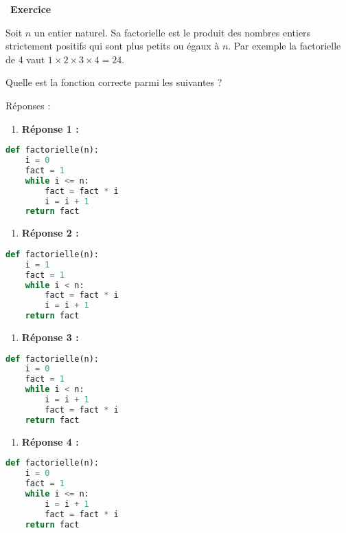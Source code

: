 \documentclass[
  11pt,
]{article}
\providecommand{\tightlist}{%
  \setlength{\itemsep}{0pt}\setlength{\parskip}{0pt}}
\newcounter{exo}
\newenvironment{exercice}[1]
{\par \medskip   \addtocounter{exo}{1} \noindent  
\begin{bclogo}[arrondi =0.1,   noborder = true, logo=\bccrayon, marge=4]{~\textbf{Exercice} \textbf{\theexo} {\itshape #1} }  \par}
{
\end{bclogo}
 \par \bigskip }
\newcounter{def}
\begin{document}
\begin{exercice}{}

Soit \(n\) un entier naturel. Sa factorielle est le produit des nombres
entiers strictement positifs qui sont plus petits ou égaux à \(n\). Par
exemple la factorielle de 4 vaut \(1 \times 2 \times 3 \times 4 = 24\).

Quelle est la fonction correcte parmi les suivantes ?

Réponses :

\begin{enumerate}
\def\labelenumi{\arabic{enumi}.}
\tightlist
\item
  \textbf{Réponse 1 :}
\end{enumerate}

\begin{lstlisting}[language=Python]
def factorielle(n):
    i = 0
    fact = 1
    while i <= n:
        fact = fact * i
        i = i + 1
    return fact
\end{lstlisting}

\begin{enumerate}
\def\labelenumi{\arabic{enumi}.}
\setcounter{enumi}{1}
\tightlist
\item
  \textbf{Réponse 2 :}
\end{enumerate}

\begin{lstlisting}[language=Python]
def factorielle(n):
    i = 1
    fact = 1
    while i < n:
        fact = fact * i
        i = i + 1
    return fact
\end{lstlisting}

\begin{enumerate}
\def\labelenumi{\arabic{enumi}.}
\setcounter{enumi}{2}
\tightlist
\item
  \textbf{Réponse 3 :}\\
\end{enumerate}

\begin{lstlisting}[language=Python]
def factorielle(n):
    i = 0
    fact = 1
    while i < n:
        i = i + 1
        fact = fact * i
    return fact
\end{lstlisting}

\begin{enumerate}
\def\labelenumi{\arabic{enumi}.}
\setcounter{enumi}{3}
\tightlist
\item
  \textbf{Réponse 4 :}
\end{enumerate}

\begin{lstlisting}[language=Python]
def factorielle(n):
    i = 0
    fact = 1
    while i <= n:
        i = i + 1
        fact = fact * i
    return fact
\end{lstlisting}

\end{exercice}
\end{document}

